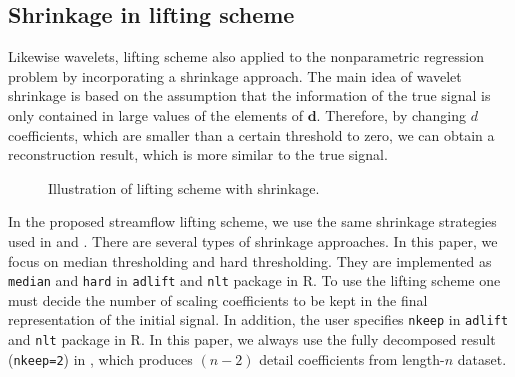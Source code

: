 \documentclass[11pt,titlepage]{article}
\begin{document}

\subsection{Shrinkage in lifting scheme}

Likewise wavelets, lifting scheme also applied to the nonparametric regression problem by incorporating a shrinkage approach. The main idea of wavelet shrinkage is based on the assumption that the information of the true signal is only contained in large values of the elements of $\mathbf{d}$. Therefore, by changing $d$ coefficients, which are smaller than a certain threshold to zero, we can obtain a reconstruction result, which is more similar to the true signal. %

\begin{figure}
	\centering
{}
\caption{Illustration of lifting scheme with shrinkage.} \label{fig:tikzpicture01}
\end{figure}

In the proposed streamflow lifting scheme, we use the same shrinkage strategies used in \cite{Nunes2006} and \cite{Knight2009}. There are several types of shrinkage approaches. In this paper, we focus on median thresholding and hard thresholding. They are implemented as \texttt{median} and \texttt{hard} in \texttt{adlift} and \texttt{nlt} package in R.
To use the lifting scheme one must decide the number of scaling coefficients to be kept in the final representation of the initial signal. In addition, the user specifies \texttt{nkeep} in \texttt{adlift} and \texttt{nlt} package in R. In this paper, we always use the fully decomposed result (\texttt{nkeep=2}) in \cite{Knight2009}, which produces $(n-2)$ detail coefficients from length-$n$ dataset. %
\end{document}
